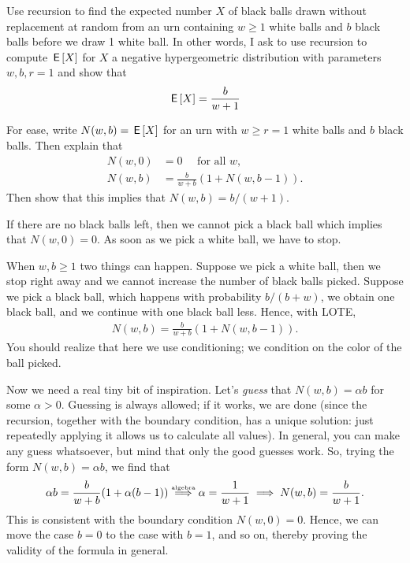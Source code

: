\documentclass[lectures]{subfiles}
\begin{document}
\begin{exercise}
Use recursion to find the expected number $X$ of black balls drawn without replacement at random from an urn containing $w\geq 1$ white balls and $b$ black balls before we draw 1 white ball.
In other words, I ask to use recursion to compute $\,\mathsf{E}\left[X\right]$ for $X$ a negative hypergeometric distribution with parameters $w,b, r=1$ and show that
\begin{align}
  \label{eq:27}
\,\mathsf{E}\left[X\right] = \frac{b}{w+1}
\end{align}
\begin{hint}
For ease, write $N(w,b)= \,\mathsf{E}\left[X\right]$ for an  urn with $w\geq r = 1$ white balls and $b$ black balls. Then explain that
\begin{align}
N(w, 0) &= 0\quad \text{ for all $w$},\\
  N(w,b) &= \frac{b}{w+b} (1+N(w, b-1)).
\end{align}
Then show that this implies that $N(w,b) = b/ (w+1)$.
\end{hint}
\begin{solution}
If there are no black balls left, then we cannot pick a black ball which implies that $N(w, 0) = 0$.
As soon as we pick a white ball, we have to stop.

When $w, b \geq 1$ two things can happen.
Suppose we pick a white ball, then we stop right away and we cannot increase the number of black balls picked.
Suppose we pick a black ball, which happens with probability $b/(b+w)$, we obtain one black ball, and we continue with one black ball less.
Hence, with LOTE,
\begin{align}
  N(w,b) = \frac{b}{w+b} (1+N(w, b-1)).
\end{align}
You should realize that here we use conditioning; we condition on the color of the ball picked.

Now we need a real tiny bit of inspiration.
Let's \emph{guess} that $N(w,b)=\alpha b$ for some $\alpha>0$.
Guessing is always allowed; if it works, we are done (since the recursion, together with the boundary condition, has a unique solution: just repeatedly applying it allows us to calculate all values).
In general, you can make any guess whatsoever, but mind that only the good guesses work. So, trying the form $N(w,b) = \alpha b$, we find that
\begin{equation*}
\alpha b = \frac{b}{w+b} (1+ \alpha (b-1)) \stackrel{\textrm{\tiny algebra}}{\implies} \alpha = \frac{1}{w+1} \implies  N(w, b) = \frac{b }{w+1}.
\end{equation*}
This is consistent with the boundary condition $N(w,0)=0$. Hence, we can move the case $b=0$ to the case with $b=1$, and so on, thereby proving the validity of the formula in general.
\end{solution}
\end{exercise}
\end{document}
